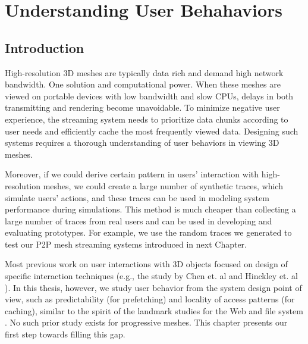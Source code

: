 \chapter{Understanding User Behahaviors}
\label{c:user}
\section{Introduction}
High-resolution 3D meshes are typically data rich and demand high network bandwidth. 
One solution and computational power. 
When these meshes are viewed on portable devices with
low bandwidth and slow CPUs, delays in both transmitting and
rendering become unavoidable. To minimize negative user experience, the
streaming system needs to prioritize data chunks according to user needs and
efficiently cache the most frequently viewed data.  Designing such
systems requires a thorough understanding of user behaviors in viewing 3D
meshes.

Moreover, if we could derive certain pattern in users' interaction with
high-resolution meshes, we could create a large number of synthetic traces,
which simulate users' actions, and these traces can be used in modeling system
performance during simulations. This method is much cheaper than collecting 
a large number of traces from real users and can be used in developing and evaluating
prototypes. For example, we use the random traces we generated to test our P2P mesh
streaming systems introduced in next Chapter.

Most previous work on user interactions with 3D objects
focused on design of specific interaction
techniques
(e.g., the study by Chen et. al \cite{chen88study} and Hinckley et. al \cite{hinckley97usability}). 
In this thesis, however, we study
user behavior from the system design point of view, 
such as predictability (for prefetching) and locality of access patterns (for caching),
similar to the spirit of the landmark studies for the Web \cite{huberman98web} and file system \cite{ousterhout85trace}.  
No such prior study exists for progressive meshes. This chapter presents our first step towards filling 
this gap.

